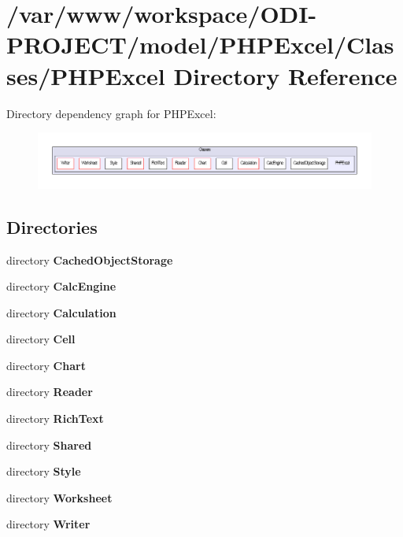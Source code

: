 \section{/var/www/workspace/\+O\+D\+I-\/\+P\+R\+O\+J\+E\+C\+T/model/\+P\+H\+P\+Excel/\+Classes/\+P\+H\+P\+Excel Directory Reference}
\label{dir_03c87dbe2e5b7b598b2d974d4e356773}
Directory dependency graph for P\+H\+P\+Excel\+:\nopagebreak
\begin{figure}[H]
\begin{center}
\leavevmode
\includegraphics[width=350pt]{dir_03c87dbe2e5b7b598b2d974d4e356773_dep}
\end{center}
\end{figure}
\subsection*{Directories}
\begin{DoxyCompactItemize}
\item 
directory {\bf Cached\+Object\+Storage}
\item 
directory {\bf Calc\+Engine}
\item 
directory {\bf Calculation}
\item 
directory {\bf Cell}
\item 
directory {\bf Chart}
\item 
directory {\bf Reader}
\item 
directory {\bf Rich\+Text}
\item 
directory {\bf Shared}
\item 
directory {\bf Style}
\item 
directory {\bf Worksheet}
\item 
directory {\bf Writer}
\end{DoxyCompactItemize}
